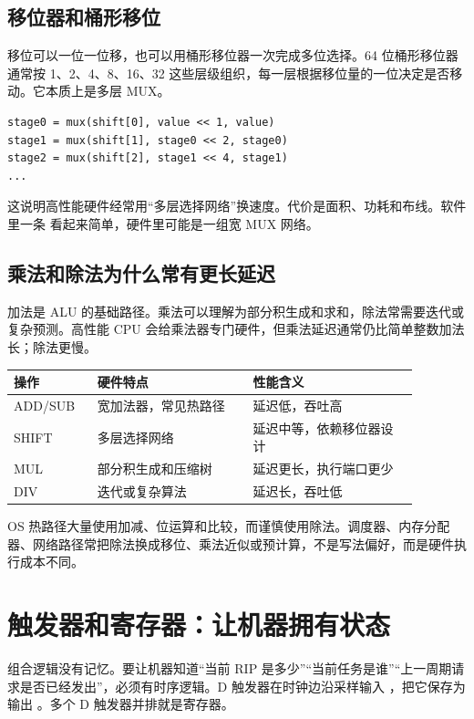 \subsection{移位器和桶形移位}

移位可以一位一位移，也可以用桶形移位器一次完成多位选择。64 位桶形移位器通常按 1、2、4、8、16、32 这些层级组织，每一层根据移位量的一位决定是否移动。它本质上是多层 MUX。

\begin{lstlisting}
stage0 = mux(shift[0], value << 1, value)
stage1 = mux(shift[1], stage0 << 2, stage0)
stage2 = mux(shift[2], stage1 << 4, stage1)
...
\end{lstlisting}

这说明高性能硬件经常用“多层选择网络”换速度。代价是面积、功耗和布线。软件里一条  看起来简单，硬件里可能是一组宽 MUX 网络。

\subsection{乘法和除法为什么常有更长延迟}

加法是 ALU 的基础路径。乘法可以理解为部分积生成和求和，除法常需要迭代或复杂预测。高性能 CPU 会给乘法器专门硬件，但乘法延迟通常仍比简单整数加法长；除法更慢。

\begin{longtable}{p{0.18\linewidth}p{0.34\linewidth}p{0.36\linewidth}}
\toprule
操作 & 硬件特点 & 性能含义 \\
\midrule
ADD/SUB & 宽加法器，常见热路径 & 延迟低，吞吐高 \\
SHIFT & 多层选择网络 & 延迟中等，依赖移位器设计 \\
MUL & 部分积生成和压缩树 & 延迟更长，执行端口更少 \\
DIV & 迭代或复杂算法 & 延迟长，吞吐低 \\
\bottomrule
\end{longtable}

OS 热路径大量使用加减、位运算和比较，而谨慎使用除法。调度器、内存分配器、网络路径常把除法换成移位、乘法近似或预计算，不是写法偏好，而是硬件执行成本不同。

\section{触发器和寄存器：让机器拥有状态}

组合逻辑没有记忆。要让机器知道“当前 RIP 是多少”“当前任务是谁”“上一周期请求是否已经发出”，必须有时序逻辑。D 触发器在时钟边沿采样输入 ，把它保存为输出 。多个 D 触发器并排就是寄存器。


